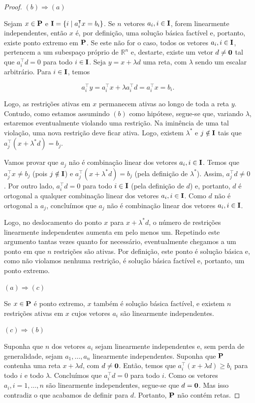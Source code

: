\begin{proof}
    $(b) \Rightarrow (a)$

    Sejam $x \in \vb P$ e $ \vb I = \{i\mid a_i^\intercal x = b_i\}$. Se $n$ vetores $a_i, i \in  \vb I$, forem linearmente independentes, então $x$ é, por definição, uma solução básica factível e, portanto, existe ponto extremo em $\vb P$. Se este não for o caso, todos os vetores $ a_i, i \in  \vb I$, pertencem a um subespaço próprio de $\mathbb{R}^n$ e, destarte, existe um vetor $d \neq \vb 0$ tal que $a_i^\intercal d = 0$ para todo $i \in  \vb I$. Seja $y = x + \lambda  d$ uma reta, com $\lambda$ sendo um escalar arbitrário. Para $i \in  \vb I$, temos

    $$a_i^\intercal y = a_i^\intercal x + \lambda a_i^\intercal d = a_i^\intercal x = b_i.$$

    Logo, as restrições ativas em $ x$ permanecem ativas ao longo de toda a reta $ y$. Contudo, como estamos assumindo $(b)$ como hipótese, segue-se que, variando $\lambda$, estaremos eventualmente violando uma restrição. Na iminência de uma tal violação, uma nova restrição deve ficar ativa. Logo, existem $\lambda^*$ e $j \notin  \vb I$ tais que $a_j^\intercal (x + \lambda^*d) = b_j$.

    Vamos provar que $ a_j$ não é combinação linear dos vetores $ a_i, i \in  \vb I$. Temos que $a_j^\intercal x \neq b_j$ (pois $j \notin  \vb I$) e $a_j^\intercal (x + \lambda^*d) = b_j$ (pela definição de $\lambda^*$). Assim, $a_j^\intercal d \neq 0$. Por outro lado, $a_i^\intercal d = 0$ para todo $i \in  \vb I$ (pela definição de $ d$) e, portanto, $ d$ é ortogonal a qualquer combinação linear dos vetores $ a_i, i \in  \vb I$. Como $ d$ não é ortogonal a $ a_j$, concluímos que $ a_j$ não é combinação linear dos vetores $ a_i, i \in  \vb I$.

    Logo, no deslocamento do ponto $ x$ para $ x + \lambda^* d$, o número de restrições linearmente independentes aumenta em pelo menos um. Repetindo este argumento tantas vezes quanto for necessário, eventualmente chegamos a um ponto em que $n$ restrições são ativas. Por definição, este ponto é solução básica e, como não violamos nenhuma restrição, é solução básica factível e, portanto, um ponto extremo.

    $(a) \Rightarrow (c)$

    Se $x \in \vb P$ é ponto extremo, $ x$ também é solução básica factível, e existem $n$ restrições ativas em $ x$ cujos vetores $ a_i$ são linearmente independentes.

    $(c) \Rightarrow (b)$

    Suponha que $n$ dos vetores $ a_i$ sejam linearmente independentes e, sem perda de generalidade, sejam $a_1,\ldots,a_n$ linearmente independentes. Suponha que $\vb P$ contenha uma reta $ x + \lambda  d$, com $d \neq \vb 0$. Então, temos que $a_i^\intercal (x + \lambda d) \geq b_i$ para todo $i$ e todo $\lambda$. Concluímos que $a_i^\intercal d = 0$ para todo $i$. Como os vetores $ a_i, i = 1,\ldots,n$ são linearmente independentes, segue-se que $d = \vb 0$. Mas isso contradiz o que acabamos de definir para $ d$. Portanto, $\vb P$ não contém retas.
\end{proof}

